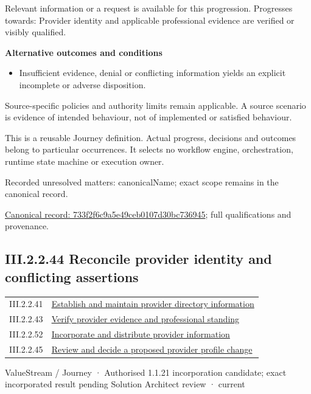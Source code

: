 Relevant information or a request is available for this progression. Progresses towards: Provider identity and applicable professional evidence are verified or visibly qualified.



\par\medskip\textbf{Alternative outcomes and conditions}\par


\begin{itemize}


\item Insufficient evidence, denial or conflicting information yields an explicit incomplete or adverse disposition.

\end{itemize}


Source-specific policies and authority limits remain applicable. A source scenario is evidence of intended behaviour, not of implemented or satisfied behaviour.



This is a reusable Journey definition. Actual progress, decisions and outcomes belong to particular occurrences. It selects no workflow engine, orchestration, runtime state machine or execution owner.


{\small Recorded unresolved matters: canonicalName; exact scope remains in the canonical record.}\par
{\footnotesize \href{../../../../../../../continuum/strategy/value-stream/733f2f6c9a5e49ceb0107d30bc736945.md}{Canonical record: 733f2f6c9a5e49ceb0107d30bc736945}; full qualifications and provenance.}\par
\subsection*{III.2.2.44 Reconcile provider identity and conflicting assertions}
\label{navigation:III.2.2.44}

\begin{longtable}{p{.22\linewidth}p{.73\linewidth}}
III.2.2.41 & \hyperref[element:679b0055ee5d42d4a838e35edd3de01f]{Establish and maintain provider directory information} \\
III.2.2.43 & \hyperref[element:733f2f6c9a5e49ceb0107d30bc736945]{Verify provider evidence and professional standing} \\
III.2.2.52 & \hyperref[element:9eb9f3210d5e4b46ac21463f54e62ab9]{Incorporate and distribute provider information} \\
III.2.2.45 & \hyperref[element:d8e20e81429945caa1508b50956475b5]{Review and decide a proposed provider profile change} \\
\end{longtable}
\label{element:3afbc885a4a74b24a1240acb8725bad2}
{\small ValueStream / Journey · Authorised 1.1.21 incorporation candidate; exact incorporated result pending Solution Architect review · current}\par

